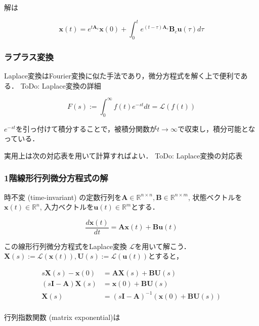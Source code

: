 解は


\begin{equation}
\mathbf{x}(t)=e^{t\mathbf{A}_c}\mathbf{x}(0)+\int_0^t e^{(t-\tau)\mathbf{A}_c}\mathbf{B}_c\mathbf{u}(\tau) d\tau
\end{equation}
\subsubsection{ラプラス変換}

Laplace変換はFourier変換に似た手法であり，微分方程式を解く上で便利である．
ToDo: Laplace変換の詳細


\begin{equation}
F(s):=\int_0^{\infty} f(t) e^{-st} dt=\mathcal{L}(f(t))
\end{equation}


$e^{-st}$を引っ付けて積分することで，被積分関数が$t\to \infty$で収束し，積分可能となっている．

実用上は次の対応表を用いて計算すればよい．
ToDo: Laplace変換の対応表
\subsubsection{1階線形行列微分方程式の解}
時不変 (time-invariant) の定数行列を$\mathbf{A} \in \mathbb{R}^{n\times n}, \mathbf{B} \in \mathbb{R}^{n\times m}$, 状態ベクトルを$\mathbf{x}(t)\in\mathbb{R}^n$, 入力ベクトルを$\mathbf{u}(t)\in\mathbb{R}^m$とする．


\begin{equation}
\frac{d\mathbf{x}(t)}{dt} = \mathbf{A}\mathbf{x}(t) + \mathbf{B}\mathbf{u}(t)
\end{equation}


この線形行列微分方程式をLaplace変換 $\mathcal{L}$を用いて解こう．$\boldsymbol{X}(s) := \mathcal{L}(\mathbf{x}(t)), \boldsymbol{U}(s) := \mathcal{L}(\mathbf{u}(t))$とすると，


\begin{align}
s\boldsymbol{X}(s) - \mathbf{x}(0) &= \mathbf{A}\boldsymbol{X}(s)+ \mathbf{B}\boldsymbol{U}(s)\\
(s\mathbf{I} - \mathbf{A}) \boldsymbol{X}(s) &= \mathbf{x}(0) + \mathbf{B}\boldsymbol{U}(s)\\
\boldsymbol{X}(s) &= (s\mathbf{I} - \mathbf{A})^{-1}(\mathbf{x}(0) + \mathbf{B}\boldsymbol{U}(s))\\
\end{align}


行列指数関数 (matrix exponential)は


